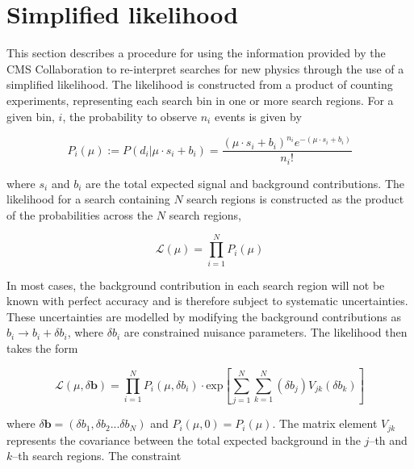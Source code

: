\section{Simplified likelihood}
\label{sec:simplified-likelihood}

This section describes a procedure for using the information provided by the CMS Collaboration to 
re-interpret searches for new physics through the use of a simplified likelihood. The likelihood is 
constructed from a product of counting experiments, representing each search bin in one or more search regions. 
For a given bin, $i$, the probability to observe $n_{i}$ events is given by

\begin{equation}
 P_{i}(\mu) := P(d_{i}|\mu \cdot s_{i}+b_{i}) = \dfrac{(\mu \cdot s_{i}+b_{i})^{n_{i}} e^{-(\mu \cdot s_{i}+b_{i})} }{n_{i}!}
\label{eq:poisson-likelihood}
\end{equation}

where $s_{i}$ and $b_{i}$ are the total expected signal and background contributions. 
The likelihood for a search containing $N$ search regions is constructed as the product 
of the probabilities across the $N$ search regions, 

\begin{equation}
\mathcal{L}(\mu) = \prod_{i=1}^{N} P_{i}(\mu)
\label{eq:stat-likelihood}
\end{equation}

In most cases, the background contribution in each search region will not be known with perfect accuracy and is therefore 
subject to systematic uncertainties. These uncertainties are modelled by modifying the background contributions as 
$b_{i}\rightarrow b_{i}+\delta b_{i}$, where $\delta b_{i}$ are constrained nuisance parameters. The likelihood then takes the form

\begin{equation}
\mathcal{L}(\mu, \delta \mathbf{b}) = \prod_{i=1}^{N} P_{i}(\mu,\delta b_{i}) \cdot \mathrm{exp} \left[ \sum_{j=1}^{N}\sum_{k=1}^{N} (\delta b_{j}) V_{jk} (\delta b_{k}) \right]
\label{eq:full-likelihood}
\end{equation}

where $\delta\mathbf{b}=(\delta b_{1},\delta b_{2}...\delta b_{N})$ and $P_{i}(\mu,0)=P_{i}(\mu)$. The matrix element $V_{jk}$ represents the covariance between
the total expected background in the $j$--th and $k$--th search regions. The constraint 

